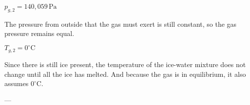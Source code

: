 \( p_{g,2} = 140,059 \, \text{Pa} \)  

The pressure from outside that the gas must exert is still constant, so the gas pressure remains equal.  

\( T_{g,2} = 0^\circ \text{C} \)  

Since there is still ice present, the temperature of the ice-water mixture does not change until all the ice has melted. And because the gas is in equilibrium, it also assumes \( 0^\circ \text{C} \).  

---